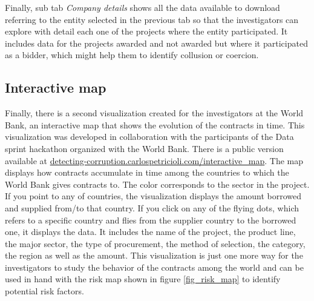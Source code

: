 Finally, sub tab \textit{Company details} shows all the data available to download referring to the entity selected in the previous tab so that the investigators can explore with detail each one of the projects where the entity participated. It includes data for the projects awarded and not awarded but where it participated as a bidder, which might help them to identify collusion or coercion.

\subsection{Interactive map}

Finally, there is a second visualization created for the investigators at the World Bank, an interactive map that shows the evolution of the contracts in time. This visualization was developed in collaboration with the participants of the Data sprint hackathon organized with the World Bank. There is a public version available at \href{http://detecting-corruption.carlospetricioli.com/interactive_map}{detecting-corruption.carlospetricioli.com/interactive\_map}. The map displays how contracts accumulate in time among the countries to which the World Bank gives contracts to. The color corresponds to the sector in the project. If you point to any of countries, the visualization displays the amount borrowed and supplied from/to that country. If you click on any of the flying dots, which refers to a specific country and flies from the supplier country to the borrowed one, it displays the data. It includes the name of the project, the product line, the major sector, the type of procurement, the method of selection, the category, the region as well as the amount. This visualization is just one more way for the investigators to study the behavior of the contracts among the world and can be used in hand with the risk map shown in figure \ref{fig_risk_map} to identify potential risk factors.



